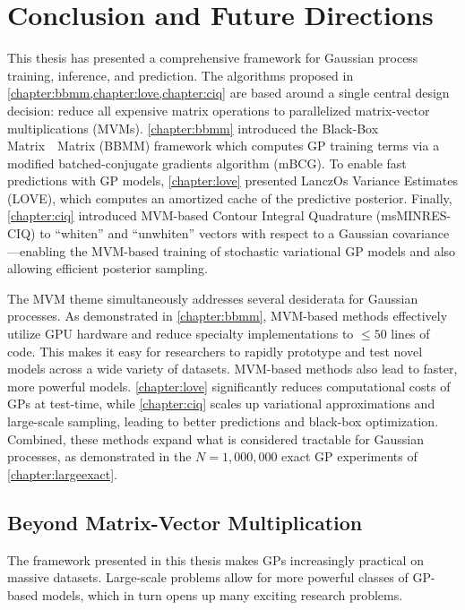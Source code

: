 \chapter{Conclusion and Future Directions}
\label{chapter:discussion}


This thesis has presented a comprehensive framework for Gaussian process training, inference, and prediction.
The algorithms proposed in \cref{chapter:bbmm,chapter:love,chapter:ciq} are based around a single central design decision: reduce all expensive matrix operations to parallelized matrix-vector multiplications (MVMs).
\cref{chapter:bbmm} introduced the Black-Box Matrix~\texttimes~Matrix (BBMM) framework which computes GP training terms via a modified batched-conjugate gradients algorithm (mBCG).
To enable fast predictions with GP models, \cref{chapter:love} presented LanczOs Variance Estimates (LOVE), which computes an amortized cache of the predictive posterior.
Finally, \cref{chapter:ciq} introduced MVM-based Contour Integral Quadrature (msMINRES-CIQ) to ``whiten'' and ``unwhiten'' vectors with respect to a Gaussian covariance---enabling
the MVM-based training of stochastic variational GP models and also allowing efficient posterior sampling.

The MVM theme simultaneously addresses several desiderata for Gaussian processes.
As demonstrated in \cref{chapter:bbmm}, MVM-based methods effectively utilize GPU hardware and reduce specialty implementations to $\leq 50$ lines of code.
This makes it easy for researchers to rapidly prototype and test novel models across a wide variety of datasets.
MVM-based methods also lead to faster, more powerful models.
\cref{chapter:love} significantly reduces computational costs of GPs at test-time, while
\cref{chapter:ciq} scales up variational approximations and large-scale sampling, leading to better predictions and black-box optimization.
Combined, these methods expand what is considered tractable for Gaussian processes, as demonstrated in the $N=1,\!000,\!000$ exact GP experiments of \cref{chapter:largeexact}.
\clearpage



\section{Beyond Matrix-Vector Multiplication}

The framework presented in this thesis makes GPs increasingly practical on massive datasets.
Large-scale problems allow for more powerful classes of GP-based models, which in turn opens up many exciting research problems.

